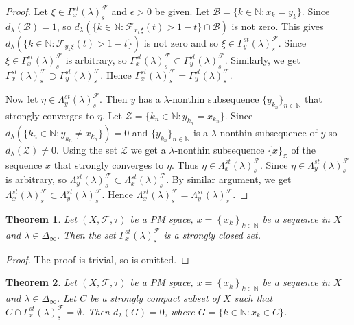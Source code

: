 \documentclass[reqno,b5paper]{amsart}
\theoremstyle{plain}
\newtheorem{thm}{Theorem}[section]
\theoremstyle{definition}
\begin{document}
\begin{proof}
Let $\xi \in \Gamma_x^{st}(\lambda)^\mathcal{F}_{s}$ and
$\epsilon>0$ be given. Let $\mathcal{B}=\{k\in\mathbb N: x_k =
y_k\}$. Since $d_\lambda(\mathcal{B})=1$, so
$d_\lambda(\{k\in\mathbb N:\mathcal{F}_{x_k\xi}(t)>1-t\}\cap
\mathcal{B})$ is not zero. This gives $d_\lambda(\{k\in\mathbb
N:\mathcal{F}_{y_k\xi}(t)>1-t\})$ is not zero and so $\xi \in
\Gamma_y^{st}(\lambda)^\mathcal{F}_{s}$. Since $\xi \in
\Gamma_x^{st}(\lambda)^\mathcal{F}_{s}$ is arbitrary, so
$\Gamma_x^{st}(\lambda)^\mathcal{F}_{s}\subset
\Gamma_y^{st}(\lambda)^\mathcal{F}_{s}$. Similarly, we get $
\Gamma _x^{st}(\lambda)^\mathcal{F}_{s} \supset
\Gamma_y^{st}(\lambda)^\mathcal{F}_{s}$. Hence
$\Gamma_x^{st}(\lambda)^\mathcal{F}_{s}=
\Gamma_y^{st}(\lambda)^\mathcal{F}_{s}$.

Now let $\eta\in \Lambda_y^{st}(\lambda)^\mathcal{F}_{s}$. Then
$y$ has a $\lambda$-nonthin subsequence $\{y_{k_n}\}_{n\in \mathbb
N}$ that strongly converges to $\eta$. Let $\mathcal{Z}=\{k_n \in
\mathbb N : y_{k_n} =  x_{k_n}\}$. Since $d_\lambda(\{k_n\in
\mathbb N : y_{k_n}\neq x_{k_n}\})=0$ and $\{y_{k_n}\}_{n\in
\mathbb N}$ is a $\lambda$-nonthin subsequence of $y$ so
$d_\lambda(\mathcal{Z}) \neq 0$. Using the set $\mathcal{Z}$ we
get a $\lambda$-nonthin subsequence $\{x\}_{\mathcal{Z}}$ of the
sequence $x$ that strongly converges to $\eta$. Thus $\eta \in
\Lambda_x^{st}(\lambda)^\mathcal{F}_{s}$. Since $\eta \in \Lambda
_y^{st}(\lambda)^\mathcal{F}_{s}$ is arbitrary, so
$\Lambda_y^{st}(\lambda)^\mathcal{F}_{s}\subset
\Lambda_x^{st}(\lambda)^\mathcal{F}_{s}$. By similar argument, we
get $\Lambda_x^{st}(\lambda)^\mathcal{F}_{s}\subset \Lambda
_y^{st}(\lambda)^\mathcal{F}_{s}$. Hence
$\Lambda_x^{st}(\lambda)^\mathcal{F}_{s}=
\Lambda_y^{st}(\lambda)^\mathcal{F}_{s}$.
\end{proof}
\begin{thm}
Let $(X,\mathcal{F},\tau)$ be a PM space,
$x=\left\{x_{k}\right\}_{k\in\mathbb N}$ be a sequence in $X$ and
$\lambda\in\Delta_\infty$. Then the set
$\Gamma_x^{st}(\lambda)^\mathcal{F}_{s}$ is a strongly closed set.
\end{thm}
\begin{proof}
The proof is trivial, so is omitted.
\end{proof}
\begin{thm}
Let $(X,\mathcal{F},\tau)$ be a PM space,
$x=\left\{x_{k}\right\}_{k\in\mathbb N}$ be a sequence in $X$ and
$\lambda\in\Delta_\infty$. Let $C$ be a strongly compact subset of
$X$ such that
$C\cap\Gamma_x^{st}(\lambda)^\mathcal{F}_{s}=\emptyset$. Then
$d_\lambda(G)=0$, where $G=\{k\in\mathbb{N}:x_k\in C\}$.
\end{thm}
\end{document}
